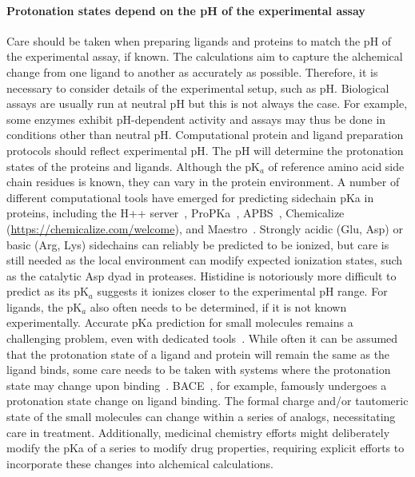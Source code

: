 \documentclass[9pt,bestpractices]{livecoms}
\begin{document}
\paragraph{Protonation states depend on the pH of the experimental assay}
Care should be taken when preparing ligands and proteins to match the pH of the experimental assay, if known.  The calculations aim to capture the alchemical change from one ligand to another as accurately as possible. Therefore, it is necessary to consider details of the experimental setup, such as pH. Biological assays are usually run at neutral pH but this is not always the case. For example, some enzymes exhibit pH-dependent activity and assays may thus be done in conditions other than neutral pH. Computational protein and ligand preparation protocols should reflect experimental pH. The pH will determine the protonation states of the proteins and ligands. Although the pK$_a$ of reference amino acid side chain residues is known, they can vary in the protein environment. A number of different computational tools have emerged for predicting sidechain pKa in proteins, including the H++ server~\cite{anandakrishnan2012automating}, ProPKa~\cite{olsson2011propka3,sondergaard2011improved}, APBS~\cite{jurrus2018improvement}, Chemicalize (\url{https://chemicalize.com/welcome}), and Maestro~\cite{maestro2020maestro}. Strongly acidic (Glu, Asp) or basic (Arg, Lys) sidechains can reliably be predicted to be ionized, but care is still needed as the local environment can modify expected ionization states, such as  the catalytic Asp dyad in proteases. Histidine is notoriously more difficult to predict as its pK$_a$ suggests it ionizes closer to the experimental pH range. For ligands, the pK$_a$ also often needs to be determined, if it is not known experimentally. Accurate pKa prediction for small molecules remains a challenging problem, even with dedicated tools~\cite{isik2018pka}. While often it can be assumed that the protonation state of a ligand and protein will remain the same as the ligand binds, some care needs to be taken with systems where the protonation state may change upon binding~\cite{onufriev2013protonation}. BACE~\cite{kim2015conformational}, for example, famously undergoes a protonation state change on ligand binding. The formal charge and/or tautomeric state of the small molecules can change within a series of analogs, necessitating care in treatment. Additionally, medicinal chemistry efforts might deliberately modify the pKa of a series to modify drug properties, requiring explicit efforts to incorporate these changes into alchemical calculations.
\end{document}
